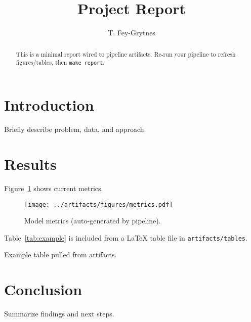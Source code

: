 \documentclass[sigconf]{acmart}
\title{Project Report}
\author{T. Fey-Grytnes}
\affiliation{%
  \institution{University of Colorado Boulder}
  \city{Boulder}
  \state{CO}
  \country{USA1}
}
\begin{document}
\begin{abstract}
This is a minimal report wired to pipeline artifacts. Re-run your pipeline to refresh figures/tables, then \texttt{make report}.
\end{abstract}
\maketitle

\section{Introduction}
Briefly describe problem, data, and approach.

\section{Results}
Figure~\ref{fig:metrics} shows current metrics.

\begin{figure}[h]
  \centering
  \texttt{[image: ../artifacts/figures/metrics.pdf]}
  \caption{Model metrics (auto-generated by pipeline).}
  \label{fig:metrics}
\end{figure}

Table~\ref{tab:example} is included from a \LaTeX{} table file in \texttt{artifacts/tables}.

\begin{table}[h]
  \centering
  
  \caption{Example table pulled from artifacts.}
  \label{tab:example}
\end{table}

\section{Conclusion}
Summarize findings and next steps.
\end{document}
